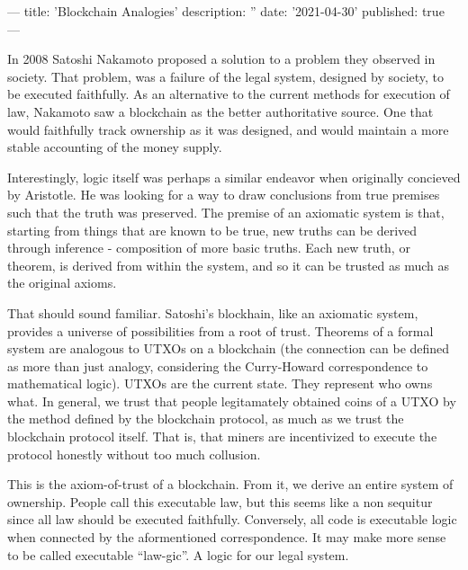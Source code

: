 ---
title: 'Blockchain Analogies'
description: ''
date: '2021-04-30'
published: true
---

In 2008 Satoshi Nakamoto proposed a solution to a problem they observed in society. That problem, was a failure of the legal system, designed by society, to be executed faithfully. As an alternative to the current methods for execution of law, Nakamoto saw a blockchain as the better authoritative source. One that would faithfully track ownership as it was designed, and would maintain a more stable accounting of the money supply.

Interestingly, logic itself was perhaps a similar endeavor when originally concieved by Aristotle. He was looking for a way to draw conclusions from true premises such that the truth was preserved. The premise of an axiomatic system is that, starting from things that are known to be true, new truths can be derived through inference - composition of more basic truths. Each new truth, or theorem, is derived from within the system, and so it can be trusted as much as the original axioms.

That should sound familiar. Satoshi’s blockhain, like an axiomatic system, provides a universe of possibilities from a root of trust. Theorems of a formal system are analogous to UTXOs on a blockchain (the connection can be defined as more than just analogy, considering the Curry-Howard correspondence to mathematical logic). UTXOs are the current state. They represent who owns what. In general, we trust that people legitamately obtained coins of a UTXO by the method defined by the blockchain protocol, as much as we trust the blockchain protocol itself. That is, that miners are incentivized to execute the protocol honestly without too much collusion.

This is the axiom-of-trust of a blockchain. From it, we derive an entire system of ownership. People call this executable law, but this seems like a non sequitur since all law should be executed faithfully. Conversely, all code is executable logic when connected by the aformentioned correspondence. It may make more sense to be called executable “law-gic”. A logic for our legal system.
